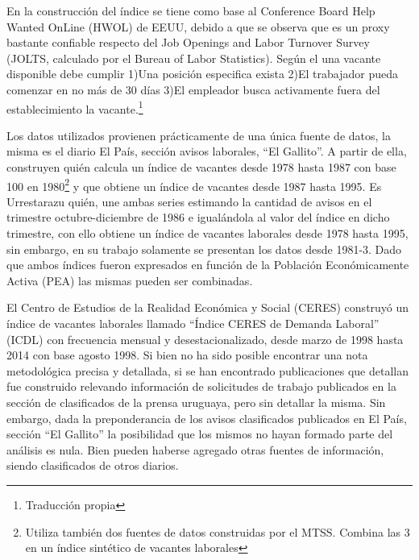 En la construcción del índice se tiene como base al Conference Board Help Wanted OnLine (HWOL) de EEUU, debido a que se observa \cite{Barnichon2010, Shimer2005} que es un proxy bastante confiable respecto del Job Openings and Labor Turnover Survey (JOLTS, calculado por el Bureau of Labor Statistics). Según el \cite{JOLTS} una vacante disponible debe cumplir 1)Una posición especifica exista 2)El trabajador pueda comenzar en no más de 30 días 3)El empleador busca activamente fuera del establecimiento la vacante.\footnote{Traducción propia} 


Los datos utilizados provienen prácticamente de una única fuente de datos, la misma es el diario El País, sección avisos laborales, ``El Gallito''. A partir de ella, construyen \cite{Rama1988} quién calcula un índice de vacantes desde 1978 hasta 1987 con base 100 en 1980\footnote{Utiliza también dos fuentes de datos construidas por el MTSS. Combina las 3 en un índice sintético de vacantes laborales} y \cite{Urrestarazu1997} que obtiene un índice de vacantes desde 1987 hasta 1995. Es Urrestarazu quién, une ambas series estimando la cantidad de avisos en el trimestre octubre-diciembre de 1986 e igualándola al valor del índice en dicho trimestre, con ello obtiene un índice de vacantes laborales desde 1978 hasta 1995, sin embargo, en su trabajo solamente se presentan los datos desde 1981-3. Dado que ambos índices fueron expresados en función de la Población Económicamente Activa (PEA) las mismas pueden ser combinadas.

El Centro de Estudios de la Realidad Económica y Social (CERES) construyó un índice de vacantes laborales llamado ``Índice CERES de Demanda Laboral'' (ICDL) con frecuencia mensual y desestacionalizado, desde marzo de 1998 hasta 2014 con base agosto 1998. Si bien no ha sido posible encontrar una nota metodológica precisa y detallada, si se han encontrado publicaciones \cite{Ceres2012} que detallan fue construido relevando información de solicitudes de trabajo publicados en la sección de clasificados de la prensa uruguaya, pero sin detallar la misma. Sin embargo, dada la preponderancia de los avisos clasificados publicados en El País, sección ``El Gallito'' la posibilidad que los mismos no hayan formado parte del análisis es nula. Bien pueden haberse agregado otras fuentes de información, siendo clasificados de otros diarios.

